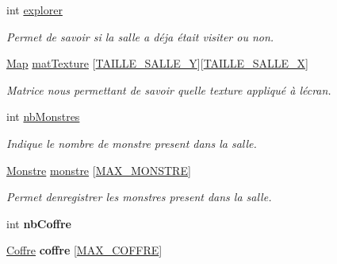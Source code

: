 \begin{DoxyCompactItemize}
int \hyperlink{structSalle_aba0461bd2cd9b0708ab85bd94d1f2e8a}{explorer}
\begin{DoxyCompactList}\small\item\em Permet de savoir si la salle a déja était visiter ou non. \end{DoxyCompactList}\item 
\mbox{\label{structSalle_a39411f4fb042ded509925b37f1e73310}} 
\hyperlink{structMap}{Map} \hyperlink{structSalle_a39411f4fb042ded509925b37f1e73310}{mat\+Texture} \mbox{[}\hyperlink{const_8h_aef95feca591fc0fcfffb4eb5c46ffbf7}{T\+A\+I\+L\+L\+E\+\_\+\+S\+A\+L\+L\+E\+\_\+Y}\mbox{]}\mbox{[}\hyperlink{const_8h_a608fae13cb35fc3e5844976e383e885a}{T\+A\+I\+L\+L\+E\+\_\+\+S\+A\+L\+L\+E\+\_\+X}\mbox{]}
\begin{DoxyCompactList}\small\item\em Matrice nous permettant de savoir quelle texture appliqué à l\textquotesingle{}écran. \end{DoxyCompactList}\item 
\mbox{\label{structSalle_ad55bad75a3143d4d866a7bbf20c887a6}} 
int \hyperlink{structSalle_ad55bad75a3143d4d866a7bbf20c887a6}{nb\+Monstres}
\begin{DoxyCompactList}\small\item\em Indique le nombre de monstre present dans la salle. \end{DoxyCompactList}\item 
\mbox{\label{structSalle_a0954d981fd9f1bac25b6fabc47f3c2e6}} 
\hyperlink{structMonstre}{Monstre} \hyperlink{structSalle_a0954d981fd9f1bac25b6fabc47f3c2e6}{monstre} \mbox{[}\hyperlink{const_8h_ae60dc3a7e8d19e739f573139251ae66b}{M\+A\+X\+\_\+\+M\+O\+N\+S\+T\+RE}\mbox{]}
\begin{DoxyCompactList}\small\item\em Permet d\textquotesingle{}enregistrer les monstres present dans la salle. \end{DoxyCompactList}\item 
\mbox{\label{structSalle_ac79b8b32c357a3ab5734a07ad719bec7}} 
int {\bfseries nb\+Coffre}
\item 
\mbox{\label{structSalle_af9cf42b22690812837cc72b577a0b8ce}} 
\hyperlink{const_8h_a25379db459b7480dd1fee01a3075f324}{Coffre} {\bfseries coffre} \mbox{[}\hyperlink{const_8h_a96c66a1f761bbc8a0ac6794f75cf1d5e}{M\+A\+X\+\_\+\+C\+O\+F\+F\+RE}\mbox{]}
\end{DoxyCompactItemize}


